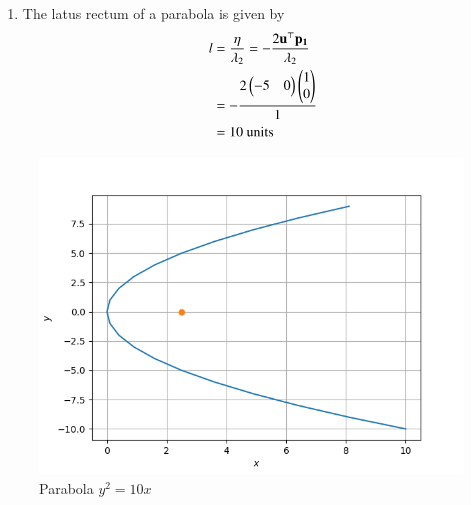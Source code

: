 \documentclass[journal,12pt,twocolumn]{IEEEtran}
\renewcommand{\vec}[1]{\boldsymbol{\mathbf{#1}}}
\begin{document}
\begin{enumerate}
\item The latus rectum of a parabola is given by 
\begin{align}
	l &= \frac{\eta}{\lambda_2}  
	 = -\frac{2\vec{u}^\top\vec{p_1}}{\lambda_2} \\
	 &= -\frac{2\myvec{-5 & 0}\myvec{1 \\ 0}}{1} \\
	 &= 10 \text{ units }
\end{align}
\end{enumerate}

\begin{figure}[!htb]
    \centering
    \includegraphics[width=\columnwidth]{figs/parabola.png}
    \caption{Parabola $y^2 = 10x$}
    \label{fig:parabola}
\end{figure}
\end{document}
